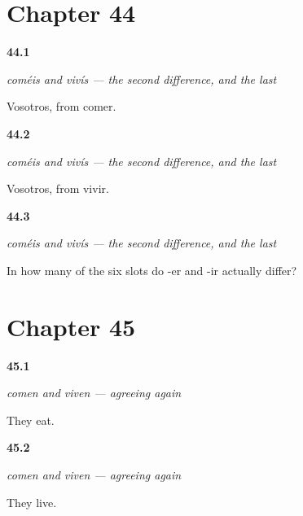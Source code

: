 \section*{Chapter 44}

\noindent\begin{minipage}[t]{\linewidth}
\raggedright
\hypertarget{review-ES-C07-comeis-vivis-eat}{\textbf{44.1}} \emph{coméis and vivís — the second difference, and the last}\par
\small Vosotros, from comer.
\end{minipage}\par\medskip

\noindent\begin{minipage}[t]{\linewidth}
\raggedright
\hypertarget{review-ES-C07-comeis-vivis-live}{\textbf{44.2}} \emph{coméis and vivís — the second difference, and the last}\par
\small Vosotros, from vivir.
\end{minipage}\par\medskip

\noindent\begin{minipage}[t]{\linewidth}
\raggedright
\hypertarget{review-ES-C07-comeis-vivis-count}{\textbf{44.3}} \emph{coméis and vivís — the second difference, and the last}\par
\small In how many of the six slots do -er and -ir actually differ?
\end{minipage}\par\medskip

\section*{Chapter 45}

\noindent\begin{minipage}[t]{\linewidth}
\raggedright
\hypertarget{review-ES-C07-comen-viven-eat}{\textbf{45.1}} \emph{comen and viven — agreeing again}\par
\small They eat.
\end{minipage}\par\medskip

\noindent\begin{minipage}[t]{\linewidth}
\raggedright
\hypertarget{review-ES-C07-comen-viven-live}{\textbf{45.2}} \emph{comen and viven — agreeing again}\par
\small They live.
\end{minipage}\par\medskip

